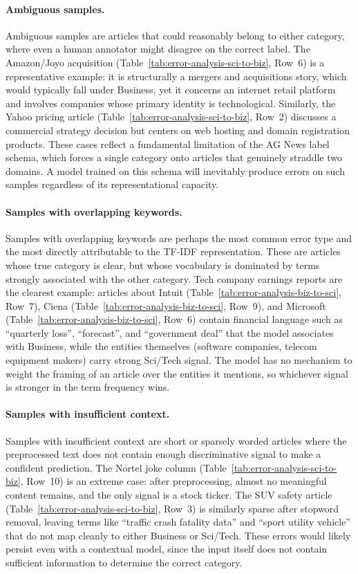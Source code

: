 \paragraph{Ambiguous samples.} Ambiguous samples are articles that could reasonably belong to either category, where even a human annotator might disagree on the correct label. The Amazon/Joyo acquisition (Table~\ref{tab:error-analysis-sci-to-biz}, Row~6) is a representative example: it is structurally a mergers and acquisitions story, which would typically fall under Business, yet it concerns an internet retail platform and involves companies whose primary identity is technological. Similarly, the Yahoo pricing article (Table~\ref{tab:error-analysis-sci-to-biz}, Row~2) discusses a commercial strategy decision but centers on web hosting and domain registration products. These cases reflect a fundamental limitation of the AG News label schema, which forces a single category onto articles that genuinely straddle two domains. A model trained on this schema will inevitably produce errors on such samples regardless of its representational capacity.

\paragraph{Samples with overlapping keywords.} Samples with overlapping keywords are perhaps the most common error type and the most directly attributable to the TF-IDF representation. These are articles whose true category is clear, but whose vocabulary is dominated by terms strongly associated with the other category. Tech company earnings reports are the clearest example: articles about Intuit (Table~\ref{tab:error-analysis-biz-to-sci}, Row~7), Ciena (Table~\ref{tab:error-analysis-biz-to-sci}, Row~9), and Microsoft (Table~\ref{tab:error-analysis-biz-to-sci}, Row~6) contain financial language such as ``quarterly loss'', ``forecast'', and ``government deal'' that the model associates with Business, while the entities themselves (software companies, telecom equipment makers) carry strong Sci/Tech signal. The model has no mechanism to weight the framing of an article over the entities it mentions, so whichever signal is stronger in the term frequency wins.

\paragraph{Samples with insufficient context.} Samples with insufficient context are short or sparsely worded articles where the preprocessed text does not contain enough discriminative signal to make a confident prediction. The Nortel joke column (Table~\ref{tab:error-analysis-sci-to-biz}, Row~10) is an extreme case: after preprocessing, almost no meaningful content remains, and the only signal is a stock ticker. The SUV safety article (Table~\ref{tab:error-analysis-sci-to-biz}, Row~3) is similarly sparse after stopword removal, leaving terms like ``traffic crash fatality data'' and ``sport utility vehicle'' that do not map cleanly to either Business or Sci/Tech. These errors would likely persist even with a contextual model, since the input itself does not contain sufficient information to determine the correct category.


